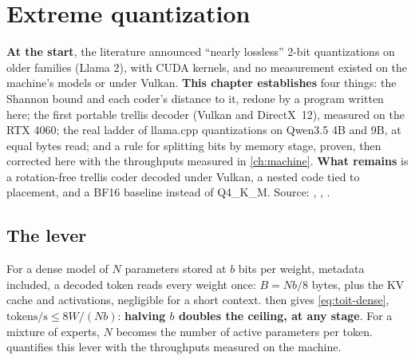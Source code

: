 \chapter{Extreme quantization}\label{ch:quant}

\begin{origine}
\textbf{At the start}, the literature announced \enquote{nearly lossless} 2-bit quantizations on older families (Llama 2), with CUDA kernels, and no measurement existed on the machine's models or under Vulkan.
\textbf{This chapter establishes} four things: the Shannon bound and each coder's distance to it, redone by a program written here; the first portable trellis decoder (Vulkan and DirectX~12), measured on the RTX 4060; the real ladder of llama.cpp quantizations on Qwen3.5 4B and 9B, at equal bytes read; and a rule for splitting bits by memory stage, proven, then corrected here with the throughputs measured in \cref{ch:machine}.
\textbf{What remains} is a rotation-free trellis coder decoded under Vulkan, a nested code tied to placement, and a BF16 baseline instead of Q4\_K\_M.
Source: , , .
\end{origine}

\section{The lever}\label{sec:quant-levier}

For a dense model of $N$ parameters stored at $b$ bits per weight, metadata included, a decoded token reads every weight once: $B = N b / 8$ bytes, plus the KV cache and activations, negligible for a short context.  then gives \cref{eq:toit-dense}, $\text{tokens/s} \le 8W/(Nb)$: \textbf{halving $b$ doubles the ceiling, at any stage}. For a mixture of experts, $N$ becomes the number of active parameters per token.  quantifies this lever with the throughputs measured on the machine.

